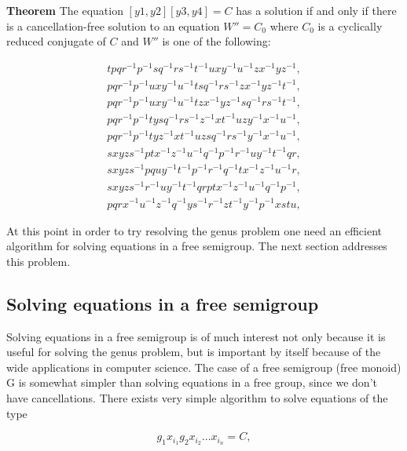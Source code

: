 \documentclass{article}
\begin{document}
\vspace{3mm}
{\bf Theorem} The equation $[y1,y2][y3,y4] = C$ has a solution if and
only if there is a cancellation-free solution to an equation $W'' =
C_0$ where $C_0$ is a cyclically reduced conjugate of $C$ and $W''$ is
one of the following:

\begin{eqnarray}
t p q r^{-1} p^{-1} s q^{-1} r s^{-1} t^{-1} u x y^{-1} u^{-1} z x^{-1} 
y z^{-1}, \label{te1} \\
p q r^{-1} p^{-1} u x y^{-1} u^{-1} t s q^{-1} r s^{-1} z x^{-1} y z^{-1} t^{-1}, \label{te2} \\
p q r^{-1} p^{-1} u x y^{-1} u^{-1} t z x^{-1} y z^{-1} s q^{-1} r s^{-1} t^{-1}, \label{te3} \\
p q r^{-1} p^{-1} t y s q^{-1} r s^{-1} z^{-1} x t^{-1} u z y^{-1} x^{-1} u^{-1}, \label{te4} \\
p q r^{-1} p^{-1} t y z^{-1} x t^{-1} u z s q^{-1} r s^{-1} y^{-1} x^{-1} u^{-1}, \label{te5} \\
s x y z s^{-1} p t x^{-1} z^{-1} u^{-1} q^{-1} p^{-1} r^{-1} u y^{-1} t^{-1} q r, \label{te6} \\
s x y z s^{-1} p q u y^{-1} t^{-1} p^{-1} r^{-1} q^{-1} t x^{-1} z^{-1} u^{-1} r, \label{te7} \\
s x y z s^{-1} r^{-1} u y^{-1} t^{-1} q r p t x^{-1} z^{-1} u^{-1} q^{-1} p^{-1}, \label{te8} \\
p q r x^{-1} u^{-1} z^{-1} q^{-1} y s^{-1} r^{-1} z t^{-1} y^{-1} p^{-1} x s t u,  \label{te9}
\end{eqnarray}

At this point in order to try resolving the genus problem one need an
efficient algorithm for solving equations in a free semigroup. The
next section addresses this problem.

\subsection{Solving equations in a free semigroup}

Solving equations in a free semigroup is of much interest not only
because it is useful for solving the genus problem, but is important
by itself because of the wide applications in computer science. The
case of a free semigroup (free monoid) G is somewhat simpler than
solving equations in a free group, since we don't have
cancellations. There exists very simple algorithm to solve equations
of the type

\begin{equation}
g_1 x_{i_1} g_2 x_{i_2} ... x_{i_n} = C, \label{semi_eq}
\end{equation}
\end{document}
